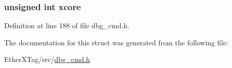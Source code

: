 \hypertarget{structdbg__cmd__type__interrupt_a78357326dd562d441c3c73f5676ac638}{
\subsubsection[{xcore}]{\setlength{\rightskip}{0pt plus 5cm}unsigned int xcore}}\label{structdbg__cmd__type__interrupt_a78357326dd562d441c3c73f5676ac638}


Definition at line 188 of file dbg\-\_\-cmd.\-h.



The documentation for this struct was generated from the following file\-:\begin{DoxyCompactItemize}
\item 
Ether\-X\-Tag/src/\hyperlink{dbg__cmd_8h}{dbg\-\_\-cmd.\-h}\end{DoxyCompactItemize}
